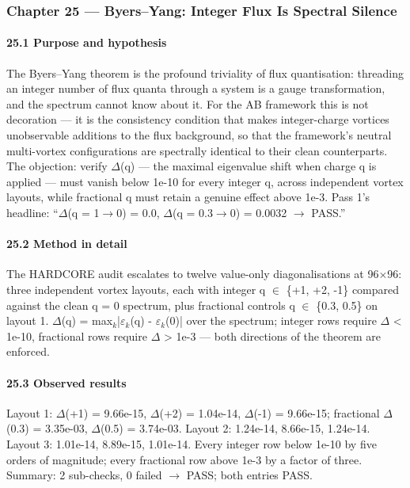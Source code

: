 \documentclass[10pt]{article}
\begin{document}
\subsubsection{Chapter 25 --- Byers--Yang: Integer Flux Is Spectral Silence}

\paragraph{25.1 Purpose and hypothesis}

The Byers--Yang theorem is the profound triviality of flux quantisation: threading an integer number of flux quanta through a system is a gauge transformation, and the spectrum cannot know about it. For the AB framework this is not decoration --- it is the consistency condition that makes integer-charge vortices unobservable additions to the flux background, so that the framework's neutral multi-vortex configurations are spectrally identical to their clean counterparts. The objection: verify $\Delta$(q) --- the maximal eigenvalue shift when charge q is applied --- must vanish below 1e-10 for every integer q, across independent vortex layouts, while fractional q must retain a genuine effect above 1e-3. Pass 1's headline: ``$\Delta$(q = 1$\rightarrow$0) = 0.0, $\Delta$(q = 0.3$\rightarrow$0) = 0.0032 $\rightarrow$ PASS.''

\paragraph{25.2 Method in detail}

The HARDCORE audit escalates to twelve value-only diagonalisations at 96$\times$96: three independent vortex layouts, each with integer q $\in$ \{+1, +2, -1\} compared against the clean q = 0 spectrum, plus fractional controls q $\in$ \{0.3, 0.5\} on layout 1. $\Delta$(q) = max$_k$|$\varepsilon$$_k$(q) - $\varepsilon$$_k$(0)| over the spectrum; integer rows require $\Delta$ < 1e-10, fractional rows require $\Delta$ > 1e-3 --- both directions of the theorem are enforced.

\paragraph{25.3 Observed results}

Layout 1: $\Delta$(+1) = 9.66e-15, $\Delta$(+2) = 1.04e-14, $\Delta$(-1) = 9.66e-15; fractional $\Delta$(0.3) = 3.35e-03, $\Delta$(0.5) = 3.74e-03. Layout 2: 1.24e-14, 8.66e-15, 1.24e-14. Layout 3: 1.01e-14, 8.89e-15, 1.01e-14. Every integer row below 1e-10 by five orders of magnitude; every fractional row above 1e-3 by a factor of three. Summary: 2 sub-checks, 0 failed $\rightarrow$ PASS; both entries PASS.
\end{document}
